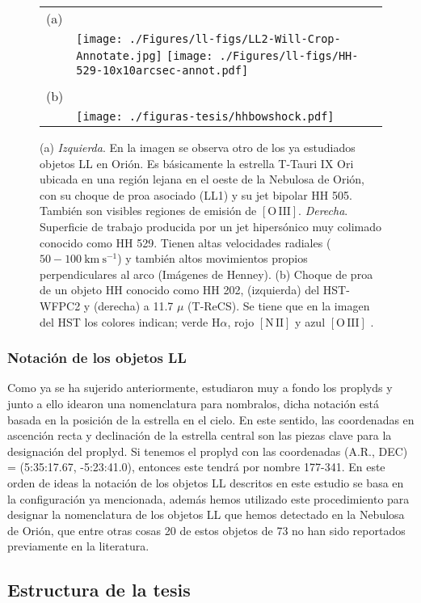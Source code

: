 \documentclass{article}
\newcommand\ha{\ensuremath{\mathrm{H}\alpha}}
\newcommand\nii{\ensuremath{\mathrm{[N\,II]}}}
\newcommand\oiii{\ensuremath{\mathrm{[O\,III]}}}
\begin{document}
\begin{figure}[htp]
\centering
\begin{tabular}{l l}
(a) & \\
 & \texttt{[image: ./Figures/ll-figs/LL2-Will-Crop-Annotate.jpg]}
\texttt{[image: ./Figures/ll-figs/HH-529-10x10arcsec-annot.pdf]}
\\
& \\[2\baselineskip]
(b) & \\
& \texttt{[image: ./figuras-tesis/hhbowshock.pdf]}
\\
\end{tabular}
\caption{(a) \textit{Izquierda}. En la imagen se observa otro de los ya estudiados objetos LL en Orión. Es básicamente la estrella T-Tauri IX Ori ubicada en una región lejana en el oeste de la Nebulosa de Orión, con su choque de proa asociado (LL1) y su jet bipolar HH 505. También son visibles regiones de emisión de \oiii{}. \textit{Derecha}. Superficie de trabajo producida por un jet hipersónico muy colimado conocido como HH 529. Tienen altas velocidades radiales (\(50-100 ~\text{km}~\text{s}^{-1}\)) y también altos  movimientos propios perpendiculares al arco (Imágenes de Henney). (b) Choque de proa de un objeto HH conocido como HH 202, (izquierda) del HST-WFPC2 y (derecha) a 11.7 \(\mu\) (T-ReCS). Se tiene que en la imagen del HST los colores indican; verde \ha{}, rojo \nii{} y azul \oiii{} \citep{Smith:2005}.}\label{fig:objecthh}
\end{figure}

\subsubsection{Notación de los objetos LL}
\label{sec:notacion}

Como ya se ha sujerido anteriormente, \citet{Odell:1994} estudiaron muy a fondo los proplyds y junto a  ello idearon una nomenclatura para nombralos, dicha notación está basada en la posición de la estrella en el cielo. En este sentido, las coordenadas en ascención recta y declinación de la estrella central son las piezas clave para la designación del proplyd. Si tenemos el proplyd con las coordenadas (A.R., DEC) = (5:35:17.67, -5:23:41.0), entonces este tendrá por nombre 177-341. En este orden de ideas la notación de los objetos LL descritos en este estudio se basa en la configuración ya mencionada, además hemos utilizado este procedimiento para designar la nomenclatura de los objetos LL que hemos detectado en la Nebulosa de Orión, que entre otras cosas 20 de estos objetos de 73 no han sido reportados previamente en la literatura.

\subsection{Estructura de la tesis}
\label{sec:estructura}


\end{document}
